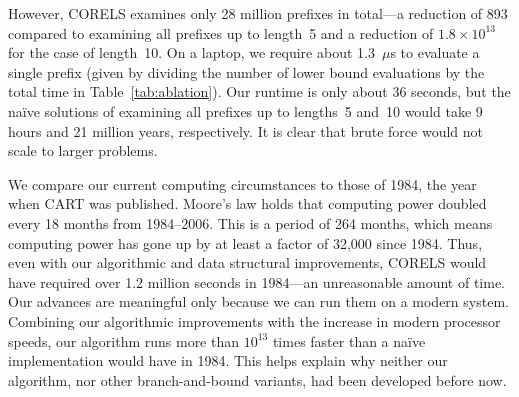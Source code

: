 However, CORELS examines only 28 million prefixes in total---a reduction of 893 compared to examining
all prefixes up to length~5 and a reduction of ${1.8 \times 10^{13}}$ for the case of length~10.
%
On a laptop, we require about 1.3~$\mu$s to evaluate a single prefix (given by dividing the number of lower bound evaluations by the total time
in Table~\ref{tab:ablation}). 
%
Our runtime is only about 36 seconds, but the na\"ive solutions of examining all prefixes up to
lengths~5 and~10 would take 9 hours and 21 million years, respectively.
%
It is clear that brute force would not scale to larger problems.

We compare our current computing circumstances to those of 1984, the year when CART was published.
%
Moore's law holds that computing power doubled every 18 months from 1984--2006.
%
This is a period of 264 months, which means computing power has gone up by at least a factor of 32,000 since 1984.
%
Thus, even with our algorithmic and data structural improvements,
CORELS would have required over 1.2 million seconds in 1984---an unreasonable amount of time.
%
Our advances are meaningful only because we can run them on a modern system.
%
Combining our algorithmic improvements with the increase in modern processor speeds,
our algorithm runs more than $10^{13}$ times faster than a na\"ive implementation would have in 1984.
%
This helps explain why neither our algorithm, nor other branch-and-bound variants, had been developed before now.

